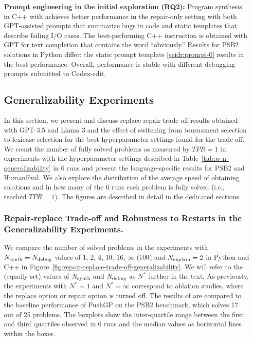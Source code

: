 \begin{framed}
\textbf{Prompt engineering in the initial exploration (RQ2):} 
Program synthesis in C++ with \method{} achieves better performance in the repair-only setting with both GPT-assisted prompts that summarize bugs in code and static templates that describe failing I/O cases. 
The best-performing C++ instruction is obtained with GPT for text completion that contains the word ``obviously.''
Results for PSB2 solutions in Python differ: the static prompt template \ref{seidr:prompt-0} results in the best performance. 
Overall, \method{} performance is stable with different debugging prompts submitted to Codex-edit.
\end{framed}


\subsection{Generalizability Experiments}

In this section, we present and discuss replace-repair trade-off results obtained with GPT-3.5 and Llama 3 and the effect of switching from tournament selection to lexicase selection for the best hyperparameter settings found for the trade-off. 
We count the number of fully solved problems as measured by $TPR=1$ in experiments with the hyperparameter settings described in Table~\ref{tab:w-n-generalizability} in 6 runs and present the language-specific results for PSB2 and HumanEval.
We also explore the distribution of the average speed of obtaining solutions 
and in how many of the 6 runs each problem is fully solved (i.e., reached $TPR=1$).
The figures are described in detail in the dedicated sections. 

\subsubsection{Repair-replace Trade-off and Robustness to Restarts in the Generalizability Experiments.}
\label{sec:seidr-treearity-ollama}\label{sec:seidr-results-rq3}

We compare the number of solved problems in the experiments with $N_\text{synth}{}=N_\text{debug}{}$ values of 1, 2, 4, 10, 16, $\infty$ (100) and $N_\text{explain}{}=2$ in Python and C++ in Figure~\ref{fig:repair-replace-trade-off-generalizability}. 
We will refer to the (equally set) values of $N_\text{synth}{}$ and $N_\text{debug}{}$ as $N^*$ further in the text.
As previously, the experiments with $N^*=1$ and $N^*=\infty$ correspond to ablation studies, where the replace option or repair option is turned off. 
The results of \method{} are compared to the baseline performance of PushGP on the PSB2 benchmark, which solves 17 out of 25 problems. 
The boxplots show the inter-quartile range between the first and third quartiles observed in 6 runs and the median values as horizontal lines within the boxes. 

